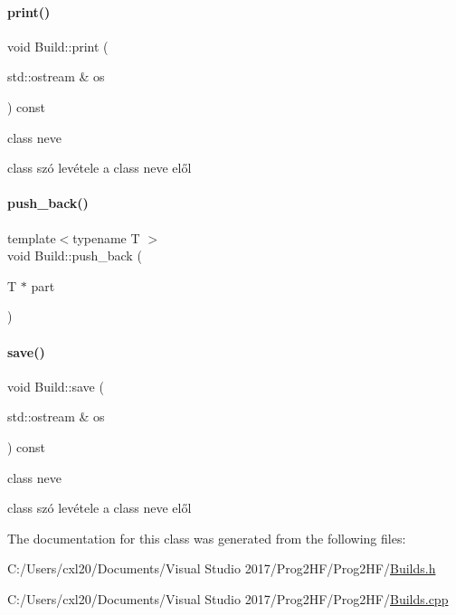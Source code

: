 \paragraph{\texorpdfstring{print()}{print()}}
{\footnotesize\ttfamily void Build\+::print (\begin{DoxyParamCaption}\item[{std\+::ostream \&}]{os }\end{DoxyParamCaption}) const}

class neve

class szó levétele a class neve elől \mbox{\label{class_build_aba0548391a8c613ed2a9d81d4d3b2a4b}} 
\paragraph{\texorpdfstring{push\_back()}{push\_back()}}
{\footnotesize\ttfamily template$<$typename T $>$ \\
void Build\+::push\+\_\+back (\begin{DoxyParamCaption}\item[{T $\ast$}]{part }\end{DoxyParamCaption})\hspace{0.3cm}{\ttfamily [inline]}}

\mbox{\label{class_build_a954cd881cec1bf789fb57d7cdf617367}} 
\paragraph{\texorpdfstring{save()}{save()}}
{\footnotesize\ttfamily void Build\+::save (\begin{DoxyParamCaption}\item[{std\+::ostream \&}]{os }\end{DoxyParamCaption}) const}

class neve

class szó levétele a class neve elől 

The documentation for this class was generated from the following files\+:\begin{DoxyCompactItemize}
\item 
C\+:/\+Users/cxl20/\+Documents/\+Visual Studio 2017/\+Prog2\+H\+F/\+Prog2\+H\+F/\mbox{\hyperlink{_builds_8h}{Builds.\+h}}\item 
C\+:/\+Users/cxl20/\+Documents/\+Visual Studio 2017/\+Prog2\+H\+F/\+Prog2\+H\+F/\mbox{\hyperlink{_builds_8cpp}{Builds.\+cpp}}\end{DoxyCompactItemize}
